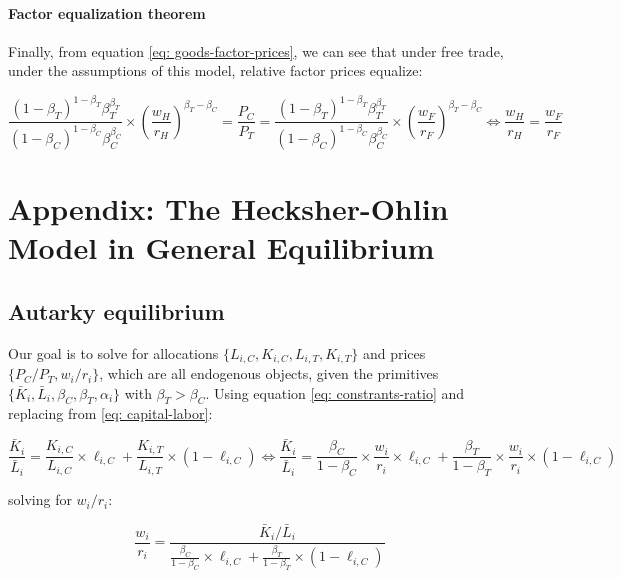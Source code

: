 \documentclass[11pt,letterpaper]{article}
\begin{document}
\paragraph{Factor equalization theorem} Finally, from equation \eqref{eq: goods-factor-prices}, we can see that under free trade, under the assumptions of this model, relative factor prices equalize:

\begin{equation*}
    \frac{(1-\beta_T)^{1-\beta_T} \beta_T^{\beta_T}}{ (1-\beta_C)^{1-\beta_C} \beta_C^{\beta_C} } \times \left(  \frac{w_H}{r_H} \right)^{\beta_T - \beta_C} = \frac{P_C}{P_T} = \frac{(1-\beta_T)^{1-\beta_T} \beta_T^{\beta_T}}{ (1-\beta_C)^{1-\beta_C} \beta_C^{\beta_C} } \times \left(  \frac{w_F}{r_F} \right)^{\beta_T - \beta_C} \iff \frac{w_H}{r_H} = \frac{w_F}{r_F}
\end{equation*}


\newpage

\appendix

\section{Appendix: The Hecksher-Ohlin Model in General Equilibrium}

\subsection*{Autarky equilibrium}

Our goal is to solve for allocations $\{L_{i,C}, K_{i,C}, L_{i,T}, K_{i,T}\}$ and prices $\{P_{C}/P_T, w_i /r_i\}$, which are all endogenous objects, given the primitives \(\{\bar K_i,\bar L_i,\beta_C,\beta_T,\alpha_i\}\)
with \(\beta_T>\beta_C\). Using equation \eqref{eq: constrants-ratio} and replacing from \eqref{eq: capital-labor}:

\begin{equation*}
   \frac{\bar{K}_i}{\bar{L}_i} = \frac{K_{i,C}}{L_{i,C}} \times \ell_{i,C} + \frac{K_{i,T}}{L_{i,T}} \times (1-\ell_{i,C}) \iff  \frac{\bar{K}_i}{\bar{L}_i} = \frac{\beta_C}{1-\beta_C} \times \frac{w_i}{r_i}  \times \ell_{i,C} + \frac{\beta_T}{1-\beta_T} \times \frac{w_i}{r_i} \times (1-\ell_{i,C})
\end{equation*}

\noindent solving for $w_i/r_i$:

\begin{equation}\label{eq: wr-l}
    \frac{w_i}{r_i} = \frac{\bar{K}_i / \bar{L}_i}{\frac{\beta_C}{1-\beta_C} \times \ell_{i,C} + \frac{\beta_T}{1-\beta_T} \times  (1-\ell_{i,C})}
\end{equation}
\end{document}
